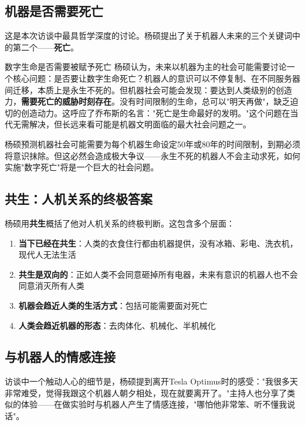 \documentclass[a4paper]{article}
\begin{document}
\subsection{机器是否需要死亡}

这是本次访谈中最具哲学深度的讨论。杨硕提出了关于机器人未来的三个关键词中的第二个——\textbf{死亡}。

\begin{warningbox}{数字生命是否需要被赋予死亡}
杨硕认为，未来以机器为主的社会可能需要讨论一个核心问题：是否要让数字生命死亡？机器人的意识可以不停复制、在不同服务器间迁移，本质上是永生不死的。但机器社会可能会发现：要达到人类级别的创造力，\textbf{需要死亡的威胁时刻存在}。没有时间限制的生命，总可以"明天再做"，缺乏迫切的创造动力。这呼应了乔布斯的名言："死亡是生命最好的发明。"这个问题在当代无需解决，但长远来看可能是机器文明面临的最大社会问题之一。
\end{warningbox}

杨硕预测机器社会可能需要为每个机器生命设定50年或80年的时间限制，到期必须将意识抹除。但这必然会造成极大争议——永生不死的机器人不会主动求死，如何实施"数字死亡"将是一个巨大的社会问题。

\subsection{共生：人机关系的终极答案}

杨硕用\textbf{共生}概括了他对人机关系的终极判断。这包含多个层面：

\begin{enumerate}
    \item \textbf{当下已经在共生}：人类的衣食住行都由机器提供，没有冰箱、彩电、洗衣机，现代人无法生活
    \item \textbf{共生是双向的}：正如人类不会同意砸掉所有电器，未来有意识的机器人也不会同意消灭所有人类
    \item \textbf{机器会趋近人类的生活方式}：包括可能需要面对死亡
    \item \textbf{人类会趋近机器的形态}：去肉体化、机械化、半机械化
\end{enumerate}

\subsection{与机器人的情感连接}

访谈中一个触动人心的细节是，杨硕提到离开Tesla Optimus时的感受："我很多天非常难受，觉得我跟这个机器人朝夕相处，现在就要离开了。"主持人也分享了类似的体验——在做实验时与机器人产生了情感连接，"哪怕他非常笨、听不懂我说话"。
\end{document}
